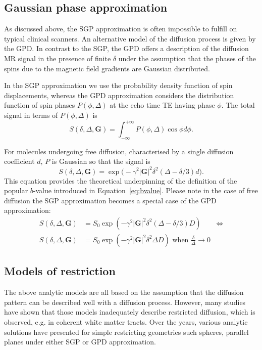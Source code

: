 \subsection{Gaussian phase approximation}
\label{GPD}
As discussed above, the SGP approximation is often impossible to fulfill on typical clinical scanners. An alternative model of the diffusion process is given by the \gls{GPD}. In contrast to the SGP, the \gls{GPD} offers a description of the diffusion MR signal in the presence of finite $\delta$ under the assumption that the phases of the spins due to the magnetic field gradients are Gaussian distributed.

In the SGP approximation we use the probability density function of spin displacements, whereas the GPD approximation considers the distribution function of spin phases $P(\phi,\Delta)$ at the echo time TE  having phase $\phi$. The total signal in terms of $P(\phi,\Delta)$ is
\begin{equation}
S(\delta,\Delta,\textbf{G})  = \int_{-\infty}^{+\infty}P(\phi,\Delta)\cos\phi d\phi.
\end{equation}

For molecules undergoing free diffusion, characterised by a single diffusion coefficient $d$,  $P$ is Gaussian so that the signal is
\begin{equation}
S(\delta,\Delta,\textbf{G})  =  \exp\Big(- \gamma^{2} |\textbf{G}|^{2} \delta^{2} (\Delta - \delta/3) d\Big).
\label{freediff}
\end{equation}
This equation provides the theoretical underpinning of the definition of the popular $b$-value introduced in Equation~\ref{eq:bvalue}\citep{LeBihan:1986}. Please note in the case of free diffusion the SGP approximation becomes a special case of the GPD approximation:
\begin{align}
S(\delta,\Delta,\textbf{G})  &  =  S_0\exp(-\gamma^{2} |\textbf{G}|^{2} \delta^{2} (\Delta - \delta/3) D) & \Leftrightarrow \\
S(\delta,\Delta,\textbf{G})  & =  S_0\exp(-\gamma^{2} |\textbf{G}|^{2} \delta^{2} \Delta D) \mbox{ when } \frac{\delta}{\Delta}\to 0 &
\label{eq: chapter2 GPD vs SGP free diff}
\end{align}



\subsection{Models of restriction}
The above analytic models are all based on the assumption that the diffusion pattern can be described well with a diffusion process. However, many studies have shown that those models inadequately describe restricted diffusion, which is observed, e.g. in coherent white matter tracts. Over the years, various analytic solutions have presented for simple restricting geometries such spheres, parallel planes \citep{Balinov:1993, Linse:1995, Callaghan:1996} under either SGP or GPD approximation.

